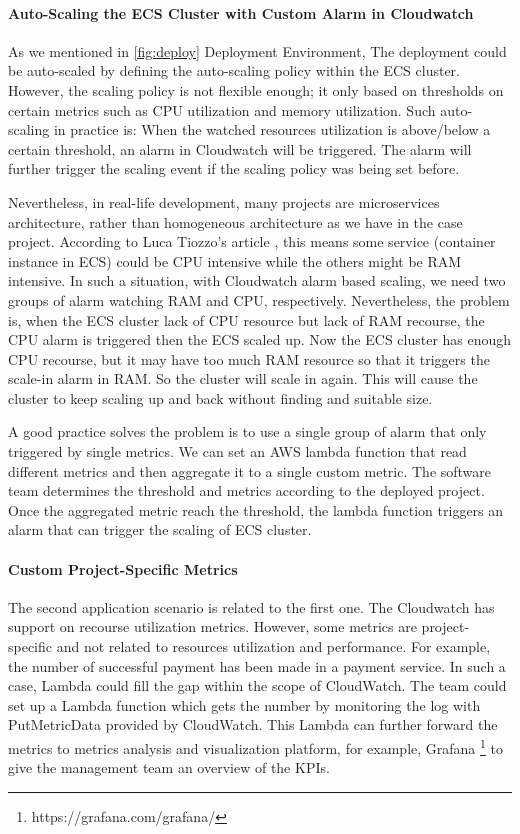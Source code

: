 \paragraph[]{Auto-Scaling the ECS Cluster with Custom Alarm in Cloudwatch}
As we mentioned in \ref{fig:deploy} Deployment Environment, The deployment could be auto-scaled by defining the auto-scaling policy within the ECS cluster. However, the scaling policy is not flexible enough; it only based on thresholds on certain metrics such as CPU utilization and memory utilization. Such auto-scaling in practice is: When the watched resources utilization is above/below a certain threshold, an alarm in Cloudwatch will be triggered. The alarm will further trigger the scaling event if the scaling policy was being set before.
\par
Nevertheless, in real-life development, many projects are microservices architecture, rather than homogeneous architecture as we have in the case project. According to Luca Tiozzo's article \cite{AWSECSho47:online}, this means some service (container instance in ECS) could be CPU intensive while the others might be RAM intensive. In such a situation, with Cloudwatch alarm based scaling, we need two groups of alarm watching RAM and CPU, respectively. Nevertheless, the problem is, when the ECS cluster lack of CPU resource but lack of RAM recourse, the CPU alarm is triggered then the ECS scaled up. Now the ECS cluster has enough CPU recourse, but it may have too much RAM resource so that it triggers the scale-in alarm in RAM. So the cluster will scale in again. This will cause the cluster to keep scaling up and back without finding and suitable size.
\par
A good practice solves the problem is to use a single group of alarm that only triggered by single metrics. We can set an AWS lambda function that read different metrics and then aggregate it to a single custom metric. The software team determines the threshold and metrics according to the deployed project. Once the aggregated metric reach the threshold, the lambda function triggers an alarm that can trigger the scaling of ECS cluster. 
\paragraph[]{Custom Project-Specific Metrics}
The second application scenario is related to the first one. The Cloudwatch has support on recourse utilization metrics. However, some metrics are project-specific and not related to resources utilization and performance. For example, the number of successful payment has been made in a payment service. In such a case, Lambda could fill the gap within the scope of CloudWatch. The team could set up a Lambda function which gets the number by monitoring the log with PutMetricData provided by CloudWatch. This Lambda can further forward the metrics to metrics analysis and visualization platform, for example, Grafana \footnote{https://grafana.com/grafana/} to give the management team an overview of the KPIs.
